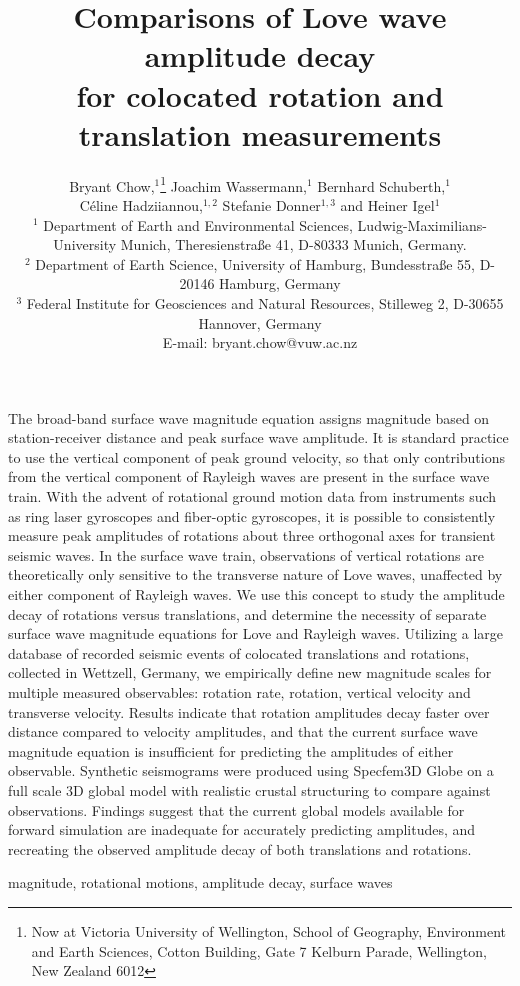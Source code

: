 \documentclass{gji}
\title[Comparisons of Love wave amplitude decay]
  {Comparisons of Love wave amplitude decay \\for colocated rotation and translation measurements}
\author[Bryant Chow]
  {Bryant Chow,$^1$\thanks{Now at Victoria University of Wellington, School of Geography, Environment and Earth Sciences, Cotton Building, Gate 7 Kelburn Parade, Wellington, New Zealand 6012} 
  Joachim Wassermann,$^1$
  Bernhard Schuberth,$^1$  \vspace{2mm}\\
  \LARGE{{\normalfont C\' eline Hadziiannou,$^{1,2}$ 
  Stefanie Donner$^{1,3}$ and
   Heiner Igel$^1$}}\vspace{2mm}  \\
  $^1$ Department of Earth and Environmental Sciences, Ludwig-Maximilians-University Munich, Theresienstra\ss e 41, D-80333 Munich, Germany.\\
  $^2$ Department of Earth Science, University of Hamburg, Bundesstra\ss e 55, D-20146 Hamburg, Germany\\
  $^3$ Federal Institute for Geosciences and Natural Resources, Stilleweg 2, D-30655 Hannover, Germany \\E-mail: bryant.chow@vuw.ac.nz
  }
\date{}
\begin{document}
\label{firstpage}

\maketitle

\begin{summary}
The broad-band surface wave magnitude equation assigns magnitude based on station-receiver distance and peak surface wave amplitude. It is standard practice to use the vertical component of peak ground velocity, so that only contributions from the vertical component of Rayleigh waves are present in the surface wave train. With the advent of rotational ground motion data from instruments such as ring laser gyroscopes and fiber-optic gyroscopes, it is possible to consistently measure peak amplitudes of rotations about three orthogonal axes for transient seismic waves. In the surface wave train, observations of vertical rotations are theoretically only sensitive to the transverse nature of Love waves, unaffected by either component of Rayleigh waves. We use this concept to study the amplitude decay of rotations versus translations, and determine the necessity of separate surface wave magnitude equations for Love and Rayleigh waves. Utilizing a large database of recorded seismic events of colocated translations and rotations, collected in Wettzell, Germany, we empirically define new magnitude scales for multiple measured observables: rotation rate, rotation, vertical velocity and transverse velocity. Results indicate that rotation amplitudes decay faster over distance compared to velocity amplitudes, and that the current surface wave magnitude equation is insufficient for predicting the amplitudes of either observable. Synthetic seismograms were produced using Specfem3D Globe on a full scale 3D global model with realistic crustal structuring to compare against observations. Findings suggest that the current global models available for forward simulation are inadequate for accurately predicting amplitudes, and recreating the observed amplitude decay of both translations and rotations.
\end{summary}

\begin{keywords}
magnitude, rotational motions, amplitude decay, surface waves
\end{keywords}
\end{document}
